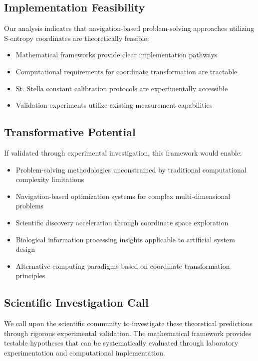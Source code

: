 \documentclass[11pt]{article}
\begin{document}
\subsection{Implementation Feasibility}

Our analysis indicates that navigation-based problem-solving approaches utilizing S-entropy coordinates are theoretically feasible:

\begin{itemize}
\item Mathematical frameworks provide clear implementation pathways
\item Computational requirements for coordinate transformation are tractable
\item St. Stella constant calibration protocols are experimentally accessible
\item Validation experiments utilize existing measurement capabilities
\end{itemize}

\subsection{Transformative Potential}

If validated through experimental investigation, this framework would enable:

\begin{itemize}
\item Problem-solving methodologies unconstrained by traditional computational complexity limitations
\item Navigation-based optimization systems for complex multi-dimensional problems
\item Scientific discovery acceleration through coordinate space exploration
\item Biological information processing insights applicable to artificial system design
\item Alternative computing paradigms based on coordinate transformation principles
\end{itemize}

\subsection{Scientific Investigation Call}

We call upon the scientific community to investigate these theoretical predictions through rigorous experimental validation. The mathematical framework provides testable hypotheses that can be systematically evaluated through laboratory experimentation and computational implementation.
\end{document}
